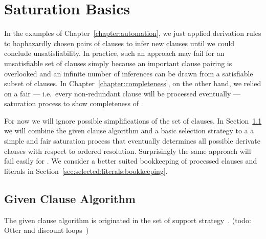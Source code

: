 \section{Saturation Basics}\label{sec:saturation:basics}

In the examples of Chapter~\ref{chapter:automation},
we just applied derivation rules
to haphazardly chosen pairs of clauses
to infer new clauses
until we could conclude unsatisfiability.
%
In practice, such an approach may fail for an unsatisfiable set of clauses
simply because an important clause pairing is overlooked
and an infinite number of inferences can be drawn
from a satisfiable subset of clauses.
%
In Chapter~\ref{chapter:completeness}, on the other hand,
we relied on a fair ---
i.e.\ every non-redundant clause will be processed eventually ---
saturation process to show completeness of \InstGenEQ{}.

For now we will ignore possible simplifications of the set of clauses.
In Section~\ref{sec:given:clause:algorithm}
we will combine the given clause algorithm
and a basic selection strategy to a a simple and fair saturation process
that eventually determines all possible derivate clauses
with respect to ordered resolution.
Surprisingly the same approach will fail easily for \InstGen{}.
We consider a better suited bookkeeping of processed clauses and literals
in Section~\ref{sec:selected:literals:bookkeeping}.



\subsection{Given Clause Algorithm}\label{sec:given:clause:algorithm}

The given clause algorithm is originated in the set of support strategy~\cite{Wos:1965:ECS:321296.321302}. (todo: Otter and discount loops~\cite{DBLP:conf/cade/SchulzM16})

